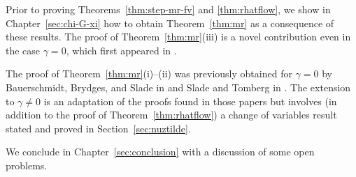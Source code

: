 {Prior to proving Theorems~\ref{thm:step-mr-fv} and \ref{thm:rhatflow}, we show in
Chapter~\ref{sec:chi-G-xi} how to obtain Theorem~\ref{thm:mr} as a consequence of
these results. The proof of
Theorem~\ref{thm:mr}(iii) is a novel contribution even in the case $\gamma = 0$,
which first appeared in \cite{BSTW-clp}.

The proof of Theorem~\ref{thm:mr}(i)--(ii) was previously obtained for $\gamma = 0$
by Bauerschmidt, Brydges, and Slade in \cite{BBS-saw4-log,BBS-phi4-log,BBS-saw4}
and Slade and Tomberg in \cite{ST-phi4}. The extension to $\gamma \ne 0$ is an adaptation
of the proofs found in those papers but involves
(in addition to the proof of Theorem~\ref{thm:rhatflow}) a change of variables result
stated and proved in Section~\ref{sec:nuztilde}.

We conclude in Chapter~\ref{sec:conclusion} with a discussion of some open problems.
}



  
